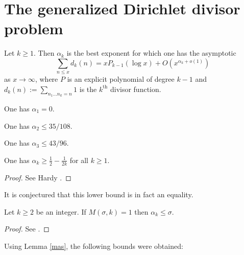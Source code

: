 \chapter{The generalized Dirichlet divisor problem}

\begin{definition}\label{divisor-def} Let $k \geq 1$. Then $\alpha_k$ is the best exponent for which one has the asymptotic
$$ \sum_{n \leq x} d_k(n) = x P_{k-1}(\log x) + O(x^{\alpha_k+o(1)})$$
as $x \to \infty$, where $P$ is an explicit polynomial of degree $k-1$ and $d_k(n) := \sum_{n_1 \dots n_k=n} 1$ is the $k^{\mathrm{th}}$ divisor function.
\end{definition}

\begin{lemma}[$d_1$ exponent]\label{divisor-1} One has $\alpha_1=0$.
\end{lemma}

\begin{lemma}\label{divisor-2-bound}\cite[Theorem 13.1]{ivic} One has $\alpha_2 \leq 35/108$.
\end{lemma}

\begin{lemma}\label{divisor-kolesnik}\cite{kolesnik} One has $\alpha_3 \leq 43/96$.
\end{lemma}


\begin{lemma}\label{divisor-lower}One has $\alpha_k \geq \frac{1}{2} - \frac{1}{2k}$ for all $k \geq 1$. 
\end{lemma}

\begin{proof} See Hardy \cite{hardy_divisor_1916}.
\end{proof}

It is conjectured that this lower bound is in fact an equality.

\begin{lemma}\label{mas}  Let $k \geq 2$ be an integer. If $M(\sigma,k) = 1$ then $\alpha_k \leq \sigma$.
\end{lemma}

\begin{proof}  See \cite[\S 13.3]{ivic}.
\end{proof}

Using Lemma \ref{mas}, the following bounds were obtained:

